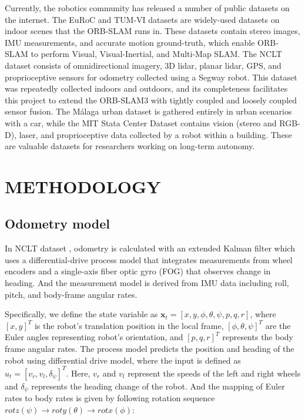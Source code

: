 \documentclass[letterpaper, 10 pt, conference]{ieeeconf}  %
\begin{document}
Currently, the robotics community has released a number of public datasets on the internet. The EuRoC \cite{euroc} and TUM-VI \cite{tumvi} datasets are widely-used datasets on indoor scenes that the ORB-SLAM runs in. These datasets contain stereo images, IMU measurements, and accurate motion ground-truth, which enable ORB-SLAM to perform Visual, Visual-Inertial, and Multi-Map SLAM. The NCLT dataset \cite{NCLT} consists of omnidirectional imagery, 3D lidar, planar lidar, GPS, and proprioceptive sensors for odometry collected using a Segway robot. This dataset was repeatedly collected indoors and outdoors, and its completeness facilitates this project to extend the ORB-SLAM3 with tightly coupled and loosely coupled sensor fusion. The Málaga urban dataset \cite{11} is gathered entirely in urban scenarios with a car, while the MIT Stata Center Dataset \cite{14} contains vision (stereo and RGB-D), laser, and proprioceptive data collected by a robot within a building. These are valuable datasets for researchers working on long-term autonomy.

\section{METHODOLOGY}
\subsection{Odometry model}
In NCLT dataset \cite{3}, odometry is calculated with an extended Kalman filter which uses a differential-drive process model that integrates measurements from wheel encoders and a single-axis fiber optic gyro (FOG) that observes change in heading. And the measurement model is derived from IMU data including roll, pitch, and body-frame angular rates.

Specifically, we define the state variable as $\textbf{x}_t=[x,y,\phi,\theta,\psi,p,q,r]$, where ${[x,y]}^T$ is the robot's translation position in the local frame, ${[\phi,\theta,\psi]}^T$ are the Euler angles representing robot's orientation, and ${[p,q,r]}^T$ represents the body frame angular rates. The process model predicts the position and heading of the robot using differential drive model, where the input is defined as $u_t={[v_r,v_l,{\delta}_\psi]}^T$. Here, $v_r$ and $v_l$ represent the speeds of the left and right wheels and ${\delta}_\psi$ represents the heading change of the robot. And the mapping of Euler rates to body rates is given by following rotation sequence $rotz(\psi)\rightarrow{roty(\theta)}\rightarrow{rotx(\phi)}$:
\end{document}
